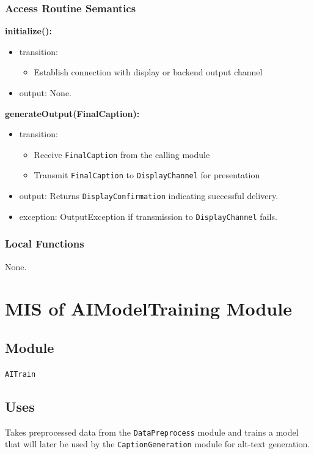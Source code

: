 \documentclass[12pt, titlepage]{article}
\begin{document}
\subsubsection{Access Routine Semantics}
\noindent \textbf{initialize():}
\begin{itemize}
  \item transition:
  \begin{itemize}
    \item Establish connection with display or backend output channel
  \end{itemize}
  \item output: None.
\end{itemize}

\noindent \textbf{generateOutput(FinalCaption):}
\begin{itemize}
  \item transition:
  \begin{itemize}
    \item Receive \texttt{FinalCaption} from the calling module
    \item Transmit \texttt{FinalCaption} to \texttt{DisplayChannel} for presentation
  \end{itemize}
  \item output: Returns \texttt{DisplayConfirmation} indicating successful delivery.
  \item exception: OutputException if transmission to \texttt{DisplayChannel} fails.
\end{itemize}

\subsubsection{Local Functions}
None.

\section{MIS of AIModelTraining Module} \label{aitrain}

\subsection{Module}
\texttt{AITrain}

\subsection{Uses}
Takes preprocessed data from the \texttt{DataPreprocess} module and trains a model that will later be used by the \texttt{CaptionGeneration} module for alt-text generation.
\end{document}
